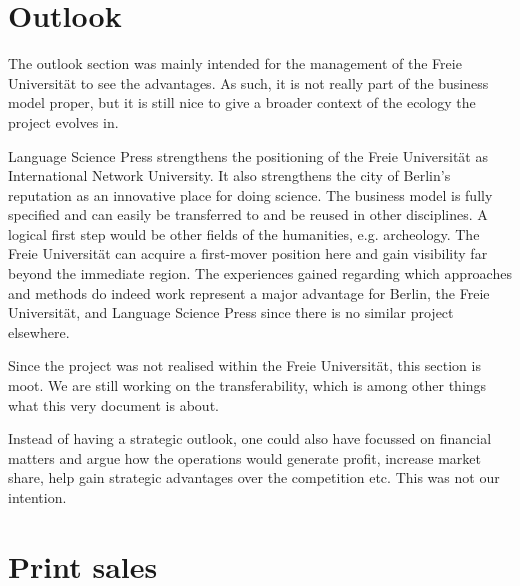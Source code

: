 \documentclass[output=guidelines,nonflat,smallfont,
draftmode
]{langsci/langscibook}
\newcommand{\background}[1]{ 
  \vspace{5mm}
  \renewcommand{\tblslinecolour}{lsDarkBlue}
  \tblssy[red]{explore2}{Background}{\vspace*{-5mm}#1}
}
\newcommand{\langscisolution}[1]{
  \renewcommand{\tblslinecolour}{lsLightBlue}
  \tblssy{langsci}{LangSci solution}{\vspace*{-5mm}#1}
}
\newcommand{\evaluation}[1]{
  \renewcommand{\tblslinecolour}{lsLightOrange}
  \tblssy{receipt}{Evaluation}{\vspace*{-5mm}#1}
}
\newcommand{\othersolutions}[1]{
  \renewcommand{\tblslinecolour}{lsDarkGreenOne}
  \tblssy{more}{Other solutions}{\vspace*{-5mm}#1}
}
\renewcommand{\tblssy}[4][black!12]{%
  \renewcommand{\langscisymbol}{#2}\renewcommand{\tblsboxcolor}{#1}
  \begin{mdframed}[style=yellowexercise,frametitle={#3}]
    #4
  \end{mdframed}
}
\begin{document}
\chapter{Outlook}

\background{The outlook section was mainly intended for the management of the Freie Universität to see the advantages. As such, it is not really part of the business model proper, but it is still nice to give a broader context of the ecology the project evolves in.}
\langscisolution{
Language Science Press strengthens the positioning of the Freie Universität as International Network University. It also strengthens the city of Berlin's reputation as an innovative place for doing science. The business model is fully specified and can easily be transferred to and be reused in other disciplines. A logical first step would be other fields of the humanities, e.g. archeology. The Freie Universität can acquire a first-mover position here and gain visibility far beyond the immediate region. The experiences gained regarding which approaches and methods do indeed work represent a major advantage for Berlin, the Freie Universität, and Language Science Press since there is no similar project elsewhere. 
}
\evaluation{Since the project was not realised within the Freie Universität, this section is moot. We are still working on the transferability, which is among other things what this very document is about.}
\othersolutions{
Instead of having a strategic outlook, one could also have focussed on financial matters and argue how the operations would generate profit, increase market share, help gain strategic advantages over the competition etc. This was not our intention. 
}
 

\appendix
\chapter{Print sales} 
\end{document}
